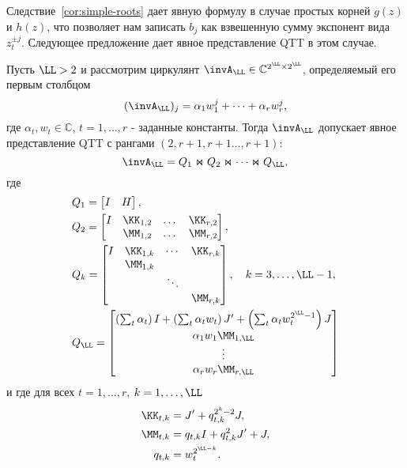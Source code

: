 Следствие~\ref{cor:simple-roots} дает явную формулу в случае простых корней $g(z)$ и $h(z)$, что позволяет нам записать $b_j$ как взвешенную сумму экспонент вида $z_t^{\pm j}$.
Следующее предложение дает явное представление QTT в этом случае.

\begin{proposition} \label{prop:sum_z}
	Пусть $\LL >2$ и рассмотрим циркулянт $\invA_\LL \in \mathbb{C}^{2^\LL \times 2^\LL}$, определяемый его первым столбцом
	\[
	(\invA_\LL)_j = \alpha_1 w_1^j + \dots + \alpha_r w_r^j,
	\]
	где $\alpha_t,w_t\in\mathbb{C}$, $t=1,\dots,r$ - заданные константы.
	Тогда $\invA_\LL$ допускает явное представление QTT с рангами $(2,r+1,r+1\dots, r+1)$:
	\[
	\invA_\LL = Q_1 \Join Q_2\Join \dots \Join Q_\LL,
	\]
	где
	\[
	\begin{split}
	&Q_1 = 
	\begin{bmatrix}
	I & H
	\end{bmatrix},
	\\
	&Q_2 = 
	\begin{bmatrix}
	I
	&
	\KK_{1,2} & \dots & \KK_{r,2} 
	\\
	&
	\MM_{1,2} & \dots & \MM_{r,2}
	\end{bmatrix},
	\\
	&Q_k = 
	\begin{bmatrix}
	I
	&
	\KK_{1,k} & \cdots & \KK_{r,k}
	\\
	& \MM_{1,k} & \\
	& & \ddots  & \\
	& & & \MM_{r,k}
	\end{bmatrix}, 
	\quad k =3,\dots,\LL-1, \\
	&Q_\LL = 
	\begin{bmatrix}
	\left(\sum_{t} \alpha_t \right) I + \left(\sum_{t} \alpha_t w_{t} \right) J' +  \left(\sum_{t} \alpha_t w_{t}^{2^{\LL}-1} \right) J \\
	\alpha_1 w_1 \MM_{1,\LL}\\
	\vdots \\
	\alpha_{r} w_{r} \MM_{r,\LL} \\
	\end{bmatrix}
	\end{split}
	\]
	и где для всех $t=1,\dots,r$, $k=1,\dots, \LL$
	\begin{align*}
	\KK_{t,k} 
	&=
	J' + q_{t,k}^{2^{k}-2} J, \\
	\MM_{t,k} &= q_{t,k}I + q_{t,k}^2 J' + J, \\
	q_{t,k} &= w_t^{2^{\LL-k}}.
	\end{align*}
\end{proposition}

